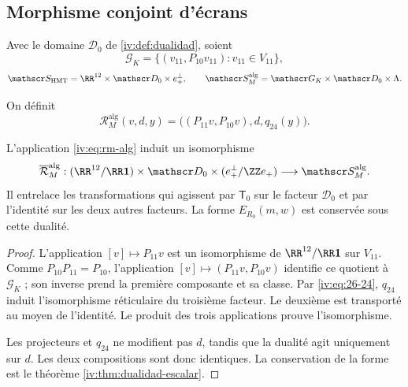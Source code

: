 \begingroup\fontsize{10}{11.7}\selectfont
\setlength{\parskip}{2pt}\setlength{\abovedisplayskip}{5pt}\setlength{\belowdisplayskip}{5pt}
\subsection{Morphisme conjoint d’écrans
}

Avec le domaine \(\mathscr D_0\) de \ref{iv:def:dualidad},
soient
\[
 \mathscr G_K=\{(v_{11},P_{10}v_{11}):v_{11}\in V_{11}\},
\]
\[
 \mathscr S_{\mathrm{HMT}}=\RR^{12}\times\mathscr D_0\times e_+^\perp,
 \qquad
 \mathscr S_M^{\mathrm{alg}}=\mathscr G_K\times\mathscr D_0\times\Lambda.
\]
\begin{definition}
\label{iv:def:rm-alg}
On définit
\begin{equation}
 \mathcal R_M^{\mathrm{alg}}(v,d,y)
 =\bigl((P_{11}v,P_{10}v),d,q_{24}(y)\bigr).
 \label{iv:eq:rm-alg}
\end{equation}
\end{definition}

\begin{theorem}
\label{iv:thm:pantallas-isomorfas}
\label{thm:k-pantallas-coordinadas}
L’application \eqref{iv:eq:rm-alg} induit un isomorphisme
\[
 \overline{\mathcal R}_M^{\mathrm{alg}}:
 (\RR^{12}/\RR\mathbf1)\times\mathscr D_0
 \times(e_+^\perp/\ZZ e_+)
 \longrightarrow\mathscr S_M^{\mathrm{alg}}.
\]
Il entrelace les transformations qui agissent par \(\mathsf T_0\)
sur le facteur \(\mathscr D_0\) et par l’identité sur les
deux autres facteurs. La forme \(E_{R_0}(m,w)\) est conservée
sous cette dualité.

\end{theorem}
\begin{proof}
L’application \([v]\mapsto P_{11}v\) est un isomorphisme
de \(\RR^{12}/\RR\mathbf1\) sur \(V_{11}\).
Comme \(P_{10}P_{11}=P_{10}\), l’application
\([v]\mapsto(P_{11}v,P_{10}v)\) identifie ce quotient
à \(\mathscr G_K\) ; son inverse prend la première composante
et sa classe. Par \eqref{iv:eq:26-24}, \(q_{24}\) induit
l’isomorphisme réticulaire du troisième facteur. Le deuxième est
transporté au moyen de l’identité. Le produit des trois
applications prouve l’isomorphisme.

Les projecteurs et \(q_{24}\) ne modifient pas \(d\), tandis que
la dualité agit uniquement sur \(d\). Les deux
compositions sont donc identiques. La conservation de la forme
est le théorème \ref{iv:thm:dualidad-escalar}.
\end{proof}

